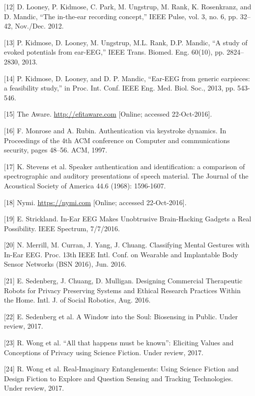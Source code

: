 \documentclass[11pt]{article}
\begin{document}
[12]
D. Looney, P. Kidmose, C. Park, M. Ungstrup, M. Rank, K. Rosenkranz, and D. Mandic,
“The in-the-ear recording concept,” IEEE Pulse, vol. 3, no. 6, pp. 32–42, Nov./Dec. 2012.

[13]
P. Kidmose, D. Looney, M. Ungstrup, M.L. Rank, D.P. Mandic, “A study of evoked
potentials from ear-EEG,” IEEE Trans. Biomed. Eng. 60(10), pp. 2824–2830, 2013.

[14]
P. Kidmose, D. Looney, and D. P. Mandic, “Ear-EEG from generic earpieces: a feasibility
study,” in Proc. Int. Conf. IEEE Eng. Med. Biol. Soc., 2013, pp. 543-546.

[15] The Aware. \url{http://efitaware.com} [Online; accessed 22-Oct-2016].

[16] F. Monrose and A. Rubin. Authentication via keystroke dynamics. In Proceedings of the 4th
ACM conference on Computer and communications security, pages 48–56. ACM, 1997.

[17]
K. Stevens et al. Speaker authentication and identification: a comparison of spectrographic
and auditory presentations of speech material. The Journal of the Acoustical Society of
America 44.6 (1968): 1596-1607.

[18] Nymi. \url{https://nymi.com} [Online; accessed 22-Oct-2016].

[19] E. Strickland. In-Ear EEG Makes Unobtrusive Brain-Hacking Gadgets a Real Possibility.
IEEE Spectrum, 7/7/2016.

[20]
N. Merrill, M. Curran, J. Yang, J. Chuang. Classifying Mental Gestures with In-Ear EEG.
Proc. 13th IEEE Intl. Conf. on Wearable and Implantable Body Sensor Networks (BSN
2016), Jun. 2016.

[21]
E. Sedenberg, J. Chuang, D. Mulligan. Designing Commercial Therapeutic Robots for
Privacy Preserving Systems and Ethical Research Practices Within the Home. Intl. J. of
Social Robotics, Aug. 2016.

[22] E. Sedenberg et al. A Window into the Soul: Biosensing in Public. Under review, 2017.

[23] R. Wong et al. “All that happens must be known”: Eliciting Values and Conceptions of
Privacy using Science Fiction. Under review, 2017.

[24]
R. Wong et al. Real-Imaginary Entanglements: Using Science Fiction and Design Fiction to
Explore and Question Sensing and Tracking Technologies. Under review, 2017.
\end{document}
